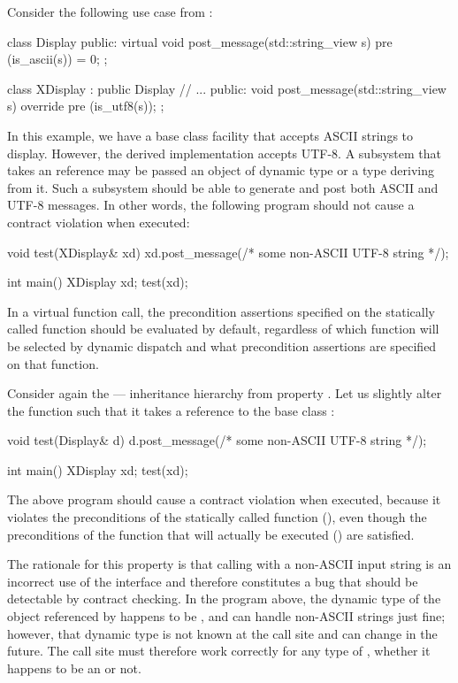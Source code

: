 Consider the following use case from \cite{P0247R0}:
\begin{codeblock}
class Display {
public:
  virtual void post_message(std::string_view s)
     pre (is_ascii(s)) = 0;
};

class XDisplay : public Display {
   // ...
public:
  void post_message(std::string_view s) override
    pre (is_utf8(s));
 };
\end{codeblock}
In this example, we have a base class facility that accepts ASCII strings to display. However, the derived implementation accepts UTF-8. A subsystem that takes an  reference may be passed an object of dynamic type  or a type deriving from it. Such a subsystem should be able to generate and post both ASCII and UTF-8 messages. In other words, the following program should not cause a contract violation when executed:
\begin{codeblock}
void test(XDisplay& xd) {
  xd.post_message(/* some non-ASCII UTF-8 string */);
}

int main() {
  XDisplay xd;
  test(xd);
}
\end{codeblock}


In a virtual function call, the precondition assertions specified on the statically called function should be evaluated by default, regardless of which function will be selected by dynamic dispatch and what  precondition assertions are specified on that function.

Consider again the  ---  inheritance hierarchy from property . Let us slightly alter the  function such that it takes a reference to the base class :
\begin{codeblock}
void test(Display& d) {
  d.post_message(/* some non-ASCII UTF-8 string */);
}

int main() {
  XDisplay xd;
  test(xd);
}
\end{codeblock}
The above program should cause a contract violation when executed, because it violates the preconditions of the statically called function (), even though the preconditions of the function that will actually be executed () are satisfied.

The rationale for this property is that calling  with a non-ASCII input string is an incorrect use of the  interface and therefore constitutes a bug that should be detectable by contract checking. In the program above, the dynamic type of the object referenced by  happens to be , and  can handle non-ASCII strings just fine; however, that dynamic type is not known at the call site and can change in the future. The call site must therefore work correctly for any type of , whether it happens to be an  or not.


